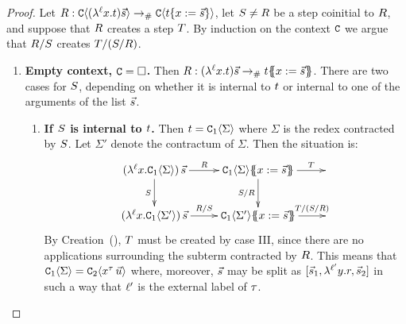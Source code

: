 \begin{proof}
Let $R : \mathtt{C}\langle(\lambda^{\ell} x. t)\vec{s}\rangle \mathrel{\to_{\mathtt{\#}}} \mathtt{C}\langle t\{x := \vec{s}\}\rangle$,
let $S \neq R$ be a step coinitial to $R$,
and suppose that $R$ creates a step $T$.
By induction on the context $\mathtt{C}$ we argue that $R/S$ creates $T/(S/R)$.
\begin{enumerate}
\item {\bf Empty context, $\mathtt{C} = \Box$.}
  Then $R : (\lambda^{\ell} x. t)\vec{s} \mathrel{\to_{\mathtt{\#}}} t\{\!\!\{x := \vec{s}\}\!\!\}$.
  There are two cases for $S$, depending on whether it is internal to $t$
  or internal to one of the arguments of the list $\vec{s}$.
  \begin{enumerate}
  \item {\bf If $S$ is internal to $t$.}
    Then $t = \mathtt{C}_1\langle\Sigma\rangle$ where $\Sigma$ is the redex contracted by $S$.
    Let $\Sigma'$ denote the contractum of $\Sigma$.
    Then the situation is:
    \[
      \xymatrix{
        (\lamp{\lab}{\var}{\con_1\of{\Sigma}})\,\ls{\tmtwo}
        \ar[r]^-{\redex}
        \ar[d]_-{\redextwo}
      &
        \con_1\of{\Sigma}\sub{\var}{\ls{\tmtwo}}
        \ar[d]_-{\redextwo/\redex}
        \ar[r]^-{\redexthree}
      &
      \\
        (\lamp{\lab}{\var}{\con_1\of{\Sigma'}})\,\ls{\tmtwo}
        \ar[r]^-{\redex/\redextwo}
      &
        \con_1\of{\Sigma'}\sub{\var}{\ls{\tmtwo}}
        \ar[r]^-{\redexthree/(\redextwo/\redex)}
      &
      }
    \]
    By Creation~(), $T$ must be created by case III,
    since there are no applications surrounding the subterm contracted by $R$.
    This means that $\mathtt{C}_1\langle\Sigma\rangle = \mathtt{C}_2\langle x^{\tau}\,\vec{u}\rangle$
    where, moreover, $\vec{s}$ may be split as $[\vec{s}_1,\lambda^{\ell'} y. r,\vec{s}_2]$
    in such a way that $\ell'$ is the external label of $\tau$.


\end{enumerate}
\end{enumerate}
\end{proof}
